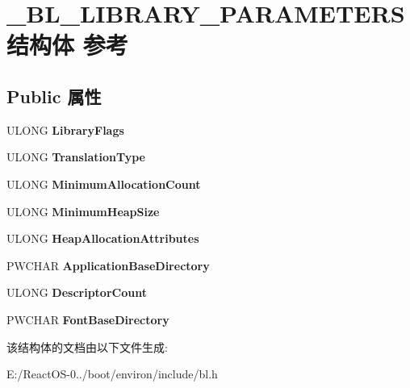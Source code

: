 \hypertarget{struct___b_l___l_i_b_r_a_r_y___p_a_r_a_m_e_t_e_r_s}{}\section{\+\_\+\+B\+L\+\_\+\+L\+I\+B\+R\+A\+R\+Y\+\_\+\+P\+A\+R\+A\+M\+E\+T\+E\+R\+S结构体 参考}
\label{struct___b_l___l_i_b_r_a_r_y___p_a_r_a_m_e_t_e_r_s}
\subsection*{Public 属性}
\begin{DoxyCompactItemize}
\item 
\mbox{\label{struct___b_l___l_i_b_r_a_r_y___p_a_r_a_m_e_t_e_r_s_a699a8eda1f43e3f6f74cba7cc177855f}} 
U\+L\+O\+NG {\bfseries Library\+Flags}
\item 
\mbox{\label{struct___b_l___l_i_b_r_a_r_y___p_a_r_a_m_e_t_e_r_s_ad1d617d1baaa1af1e622644b227a6972}} 
U\+L\+O\+NG {\bfseries Translation\+Type}
\item 
\mbox{\label{struct___b_l___l_i_b_r_a_r_y___p_a_r_a_m_e_t_e_r_s_aa7287008145e1467c4178d3e35d93de6}} 
U\+L\+O\+NG {\bfseries Minimum\+Allocation\+Count}
\item 
\mbox{\label{struct___b_l___l_i_b_r_a_r_y___p_a_r_a_m_e_t_e_r_s_a2a9dbc081b67a2082a6867594357d27d}} 
U\+L\+O\+NG {\bfseries Minimum\+Heap\+Size}
\item 
\mbox{\label{struct___b_l___l_i_b_r_a_r_y___p_a_r_a_m_e_t_e_r_s_a71fcce862df2bf0f07c780eb570fb870}} 
U\+L\+O\+NG {\bfseries Heap\+Allocation\+Attributes}
\item 
\mbox{\label{struct___b_l___l_i_b_r_a_r_y___p_a_r_a_m_e_t_e_r_s_a18ce7682a31b81bcae5139f534e22689}} 
P\+W\+C\+H\+AR {\bfseries Application\+Base\+Directory}
\item 
\mbox{\label{struct___b_l___l_i_b_r_a_r_y___p_a_r_a_m_e_t_e_r_s_a7c18aad765a2c78a6e4ce068d333201f}} 
U\+L\+O\+NG {\bfseries Descriptor\+Count}
\item 
\mbox{\label{struct___b_l___l_i_b_r_a_r_y___p_a_r_a_m_e_t_e_r_s_a05e181ffdee09e995ea29b75a8aa536e}} 
P\+W\+C\+H\+AR {\bfseries Font\+Base\+Directory}
\end{DoxyCompactItemize}


该结构体的文档由以下文件生成\+:\begin{DoxyCompactItemize}
\item 
E\+:/\+React\+O\+S-\/0../boot/environ/include/bl.\+h\end{DoxyCompactItemize}
